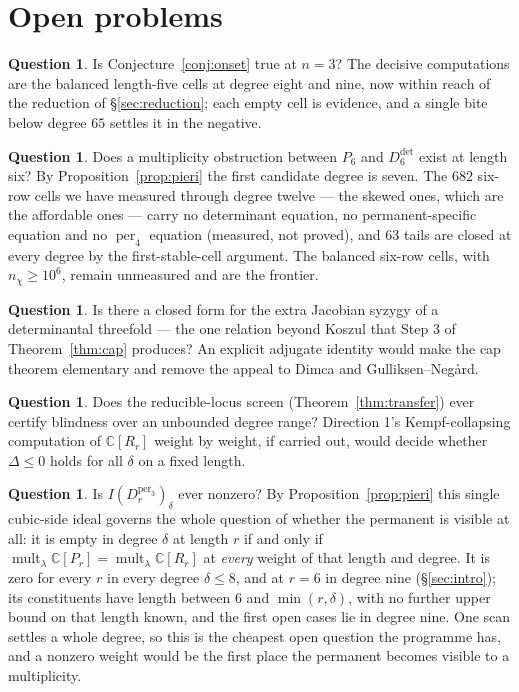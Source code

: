 \documentclass[11pt]{amsart}
\theoremstyle{plain}
\theoremstyle{definition}
\newtheorem{question}[theorem]{Question}
\theoremstyle{remark}
\DeclareMathOperator{\mult}{mult}
\DeclareMathOperator{\per}{per}
\newcommand{\bC}{\mathbb{C}}
\newcommand{\Rr}{R}
\newcommand{\Pp}{P}
\newcommand{\Ddet}{D^{\det}}
\begin{document}
\section{Open problems}\label{sec:open}

\begin{question}
Is Conjecture~\ref{conj:onset} true at $n=3$?  The decisive computations are the
balanced length-five cells at degree eight and nine, now within reach of the
reduction of \S\ref{sec:reduction}; each empty cell is evidence, and a single
bite below degree $65$ settles it in the negative.
\end{question}

\begin{question}
Does a multiplicity obstruction between $\Pp_6$ and $\Ddet_6$ exist at length
six?  By Proposition~\ref{prop:pieri} the first candidate degree is seven.  The
$682$ six-row cells we have measured through degree twelve --- the skewed ones,
which are the affordable ones --- carry no determinant equation, no
permanent-specific equation and no $\per_4$ equation (measured, not proved),
and $63$ tails are closed
at every degree by the first-stable-cell argument.  The balanced six-row cells,
with $n_\chi\ge10^{6}$, remain unmeasured and are the frontier.
\end{question}

\begin{question}
Is there a closed form for the extra Jacobian syzygy of a determinantal
threefold --- the one relation beyond Koszul that Step 3 of
Theorem~\ref{thm:cap} produces?  An explicit adjugate identity would make the
cap theorem elementary and remove the appeal to Dimca and Gulliksen--Neg\aa rd.
\end{question}

\begin{question}
Does the reducible-locus screen (Theorem~\ref{thm:transfer}) ever certify
blindness over an unbounded degree range?  Direction 1's Kempf-collapsing
computation of $\bC[\Rr_r]$ weight by weight, if carried out, would decide
whether $\Delta\le0$ holds for all $\delta$ on a fixed length.
\end{question}

\begin{question}
Is $I(D^{\per_3}_r)_\delta$ ever nonzero?  By
Proposition~\ref{prop:pieri} this single cubic-side ideal governs the whole
question of whether the permanent is visible at all: it is empty in degree
$\delta$ at length $r$ if and only if $\mult_\lambda\bC[\Pp_r]=
\mult_\lambda\bC[\Rr_r]$ at \emph{every} weight of that length and degree.  It
is zero for every $r$ in every degree $\delta\le8$, and at $r=6$ in degree
nine (\S\ref{sec:intro}); its constituents have length between $6$ and
$\min(r,\delta)$, with no further upper bound on that length known, and the
first open cases lie in degree nine.  One scan settles a whole
degree, so
this is the cheapest open question the programme has, and a nonzero weight would
be the first place the permanent becomes visible to a multiplicity.
\end{question}
\end{document}
